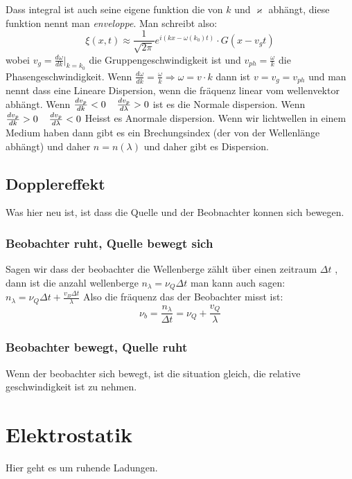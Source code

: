 \documentclass{article}
\newcommand{\mspc}{\hspace{0.4cm}}
\begin{document}
Dass integral ist auch seine eigene funktion die von $k$ und $\varkappa$ abhängt, diese funktion nennt man \textit{enveloppe}. Man schreibt also:
\[\xi(x,t)\approx \frac{1}{\sqrt{2\pi}} e^{i(kx-\omega(k_0)t)} \cdot G(x-v_gt)\] wobei $v_g=\frac{d\omega}{dk}\left.\right|_{k=k_0}$ die Gruppengeschwindigkeit ist und $v_{ph}=\frac{\omega}{k}$ die Phasengeschwindigkeit.\newline
Wenn $\frac{d\omega}{dk}=\frac{\omega}{k}\Rightarrow\omega=v\cdot k$ dann ist $v=v_g=v_{ph}$ und man nennt dass eine Lineare Dispersion, wenn die fräquenz linear vom wellenvektor abhängt.\newline
Wenn $\frac{dv_p}{dk}<0\mspc \frac{dv_p}{d\lambda}>0$ ist es die Normale dispersion.
\newline Wenn $\frac{dv_p}{dk}>0\mspc\frac{dv_p}{d\lambda}<0$ Heisst es Anormale dispersion.\newline
Wenn wir lichtwellen in einem Medium haben dann gibt es ein Brechungsindex (der von der Wellenlänge abhängt) und daher $n=n(\lambda)$ und daher gibt es Dispersion. 
\subsection{Dopplereffekt} Was hier neu ist, ist dass die Quelle und der Beobnachter konnen sich bewegen.
\subsubsection{Beobachter ruht, Quelle bewegt sich} Sagen wir dass der beobachter die Wellenberge zählt über einen zeitraum $\Delta t$ , dann ist die anzahl wellenberge $n_\lambda=\nu_Q\Delta t$
man kann auch sagen: $n_\lambda=\nu_Q\Delta t+\frac{v_B\Delta t}{\lambda}$ Also die fräquenz das der Beobachter misst ist: \[\nu_b=\frac{n_\lambda}{\Delta t}=\nu_Q+\frac{v_Q}{\lambda}\]
\subsubsection{Beobachter bewegt, Quelle ruht} Wenn der beobachter sich bewegt, ist die situation gleich, die relative geschwindigkeit ist zu nehmen.


\section{Elektrostatik} Hier geht es um ruhende Ladungen.
\end{document}

